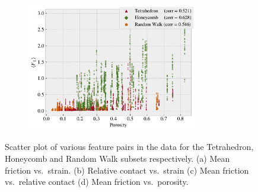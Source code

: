 \begin{figure}[H]
\begin{subfigure}[t]{0.49\textwidth}
      \caption{}
  \end{subfigure}
  \hfill
  \begin{subfigure}[t]{0.49\textwidth}
      \centering
      \raggedright
      \includegraphics[width=0.82\textwidth]{figures/ML/corr_porosity_Ff.pdf}
      \caption{}
  \end{subfigure}
  \hfill
     \caption{Scatter plot of various feature pairs in the data for the Tetrahedron, Honeycomb and Random Walk subsets respectively. (a) Mean friction vs.\ strain. (b) Relative contact vs.\ strain (c) Mean friction vs.\ relative contact (d) Mean friction vs.\ porosity.}
     \label{fig:corr_vis}
\end{figure}

